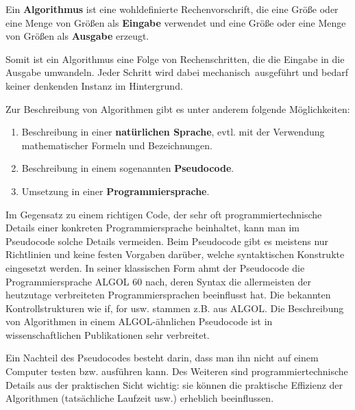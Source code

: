 \begin{defn}
Ein \textbf{Algorithmus} ist eine wohldefinierte Rechenvorschrift, die eine
Größe oder eine Menge von Größen als \textbf{Eingabe} verwendet und eine Größe oder eine Menge von Größen als \textbf{Ausgabe} erzeugt.

Somit ist ein Algorithmus eine Folge von Rechenschritten, die die Eingabe in die Ausgabe umwandeln. Jeder Schritt wird dabei \glqq mechanisch\grqq\ ausgeführt und bedarf keiner denkenden Instanz im Hintergrund.
\end{defn}

\begin{bem} 
Zur Beschreibung von Algorithmen
gibt es unter anderem folgende Möglichkeiten: 
\begin{enumerate}
	\item Beschreibung in einer \textbf{natürlichen Sprache}, evtl. mit der Verwendung mathematischer Formeln und Bezeichnungen. 
	\item Beschreibung in einem sogenannten \textbf{Pseudocode}. 
	\item Umsetzung in einer \textbf{Programmiersprache}. 
\end{enumerate} 
Im Gegensatz zu einem richtigen Code, der sehr oft programmiertechnische Details einer konkreten Programmiersprache beinhaltet, kann man im Pseudocode solche Details vermeiden. Beim Pseudocode gibt es meistens nur Richtlinien und keine festen Vorgaben darüber, welche syntaktischen Konstrukte eingesetzt werden. In seiner klassischen Form ahmt der Pseudocode die Programmiersprache ALGOL 60 nach, deren Syntax die allermeisten der heutzutage verbreiteten Programmiersprachen beeinflusst hat. Die bekannten Kontrollstrukturen wie if, for usw.  stammen z.B. aus ALGOL. Die Beschreibung von Algorithmen in einem ALGOL-ähnlichen Pseudocode ist in wissenschaftlichen Publikationen sehr verbreitet. 

Ein Nachteil des Pseudocodes besteht darin, dass man ihn nicht auf einem Computer testen bzw. ausführen kann. Des Weiteren sind programmiertechnische Details aus der praktischen Sicht wichtig: sie können  die praktische Effizienz der Algorithmen (tatsächliche Laufzeit usw.) erheblich beeinflussen. 
\end{bem} 

